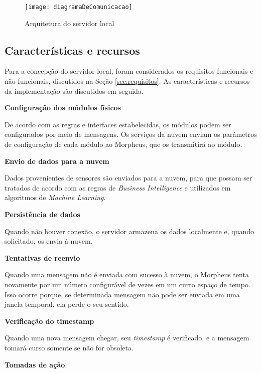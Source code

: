 \begin{figure}
	\centering
	\caption{Arquitetura do servidor local}
  \texttt{[image: diagramaDeComunicacao]}
\label{fig:diagramaDeComunicacao}
\end{figure}

\subsection{Características e recursos}
Para a concepção do servidor local, foram considerados os requisitos funcionais e não-funcionais, discutidos na Seção \ref{sec:requisitos}. As características e recursos da implementação são discutidos em seguida.

\begin{description}

\item \textbf{Configuração dos módulos físicos}

De acordo com as regras e interfaces estabelecidas, os módulos podem ser configurados por meio de mensagens. Os serviços da nuvem enviam os parâmetros de configuração de cada módulo ao Morpheus, que os transmitirá ao módulo.

\item \textbf{Envio de dados para a nuvem}

Dados provenientes de sensores são enviados para a nuvem, para que possam ser tratados de acordo com as regras de \emph{Business Intelligence} e utilizados em algoritmos de \emph{Machine Learning}.

\item \textbf{Persistência de dados}

Quando não houver conexão, o servidor armazena os dados localmente e, quando solicitado, os envia à nuvem.

\item \textbf{Tentativas de reenvio}

Quando uma mensagem não é enviada com sucesso à nuvem, o Morpheus tenta novamente por um número configurável de vezes em um curto espaço de tempo. Isso ocorre porque, se determinada mensagem não pode ser enviada em uma janela temporal, ela perde o seu sentido.

\item \textbf{Verificação do timestamp}

Quando uma nova mensagem chegar, seu \emph{timestamp} é verificado, e a mensagem tomará curso somente se não for obsoleta.

\item \textbf{Tomadas de ação}


\end{description}

